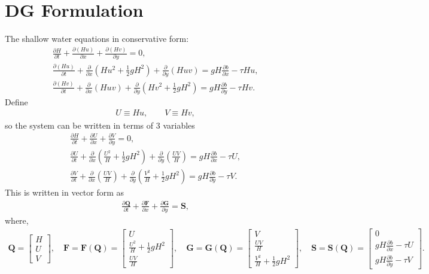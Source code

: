 \documentclass[11pt]{article}
\begin{document}
\section{DG Formulation}
\noindent The shallow water equations in conservative form:
\begin{gather}
\frac{\partial H}{\partial t} + \frac{\partial (Hu)}{\partial x} + \frac{\partial(Hv)}{\partial y} = 0, \\
\frac{\partial (Hu)}{\partial t} + \frac{\partial}{\partial x}\left(Hu^2 + \frac{1}{2}gH^2 \right) + \frac{\partial}{\partial y}\left(Huv\right) = gH\frac{\partial b}{\partial x} - \tau Hu, \\
\frac{\partial (Hv)}{\partial t} + \frac{\partial}{\partial x}\left(Huv\right) + \frac{\partial}{\partial y}\left(Hv^2 + \frac{1}{2}gH^2 \right) = gH\frac{\partial b}{\partial y} - \tau Hv.
\end{gather}
Define
\begin{gather}
U \equiv Hu, \quad\quad V \equiv Hv,
\end{gather}
so the system can be written in terms of 3 variables
\begin{gather}
\frac{\partial H}{\partial t} + \frac{\partial U}{\partial x} + \frac{\partial V}{\partial y} = 0,\\
\frac{\partial U}{\partial t} + \frac{\partial}{\partial x}\left(\frac{U^2}{H} + \frac{1}{2}gH^2 \right) + \frac{\partial}{\partial y}\left(\frac{UV}{H} \right) = gH\frac{\partial b}{\partial x} - \tau U,\\
\frac{\partial V}{\partial t} + \frac{\partial}{\partial x}\left(\frac{UV}{H} \right) + \frac{\partial}{\partial y}\left(\frac{V^2}{H} + \frac{1}{2}gH^2 \right) = gH\frac{\partial b}{\partial y} - \tau V.
\end{gather}
This is written in vector form as
\begin{gather}
\frac{\partial \mathbf{Q}}{\partial t} + \frac{\partial \mathbf{F}}{\partial x} + \frac{\partial \mathbf{G}}{\partial y} = \mathbf{S},
\end{gather}
where,
\begin{gather}
\mathbf{Q} = \begin{bmatrix} H \\[5pt] U \\[5pt] V \end{bmatrix}, \quad \mathbf{F} = \mathbf{F}(\mathbf{Q}) =\begin{bmatrix} U \\[5pt] \frac{U^2}{H} + \frac{1}{2}gH^2 \\[5pt] \frac{UV}{H} \end{bmatrix}, \quad \mathbf{G} = \mathbf{G}(\mathbf{Q}) = \begin{bmatrix} V \\[5pt] \frac{UV}{H} \\[5pt] \frac{V^2}{H} + \frac{1}{2}gH^2 \end{bmatrix}, \quad \mathbf{S} = \mathbf{S}(\mathbf{Q}) = \begin{bmatrix} 0 \\[5pt] gH\frac{\partial b}{\partial x} - \tau U \\[5pt] gH\frac{\partial b}{\partial y} -\tau V  \end{bmatrix}.
\end{gather}
\end{document}
